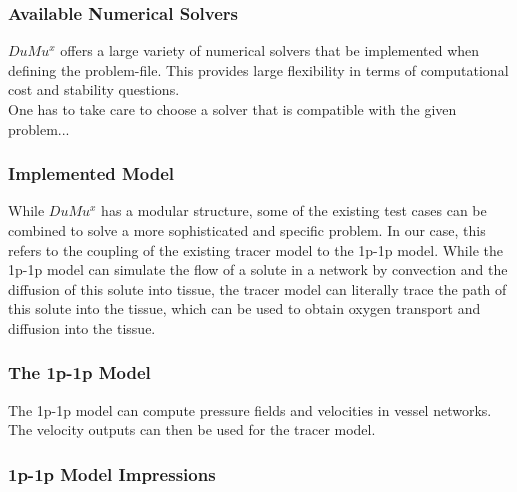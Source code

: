 \newpage
\subsubsection*{Available Numerical Solvers}

$DuMu^x$ offers a large variety of numerical solvers that be implemented when defining the problem-file. This provides large flexibility in terms of computational cost and stability questions. \cite{flemischdumux}
\\One has to take care to choose a solver that is compatible with the given problem...

\subsubsection{Implemented Model}

While $DuMu^x$ has a modular structure, some of the existing test cases can be combined to solve a more sophisticated and specific problem. In our case, this refers to the coupling of the existing tracer model to the 1p-1p model. While the 1p-1p model can simulate the flow of a solute in a network by convection and the diffusion of this solute into tissue, the tracer model can literally trace the path of this solute into the tissue, which can be used to obtain oxygen transport and diffusion into the tissue.

\subsubsection*{The 1p-1p Model}

The 1p-1p model can compute pressure fields and velocities in vessel networks. The velocity outputs can then be used for the tracer model.

\subsubsection*{\footnotesize 1p-1p Model Impressions}

